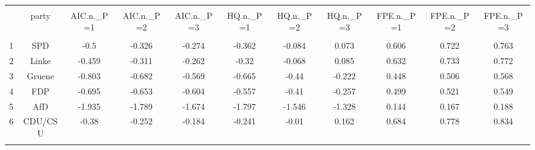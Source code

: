 \begin{table}[!htbp] \centering 
  \caption{} 
  \label{} 
\begin{tabular}{@{\extracolsep{5pt}} ccccccccccc} 
\\[-1.8ex]\hline 
\hline \\[-1.8ex] 
 & party & AIC.n.\_P=1 & AIC.n.\_P=2 & AIC.n.\_P=3 & HQ.n.\_P=1 & HQ.n.\_P=2 & HQ.n.\_P=3 & FPE.n.\_P=1 & FPE.n.\_P=2 & FPE.n.\_P=3 \\ 
\hline \\[-1.8ex] 
1 & SPD & -0.5 & -0.326 & -0.274 & -0.362 & -0.084 & 0.073 & 0.606 & 0.722 & 0.763 \\ 
2 & Linke & -0.459 & -0.311 & -0.262 & -0.32 & -0.068 & 0.085 & 0.632 & 0.733 & 0.772 \\ 
3 & Gruene & -0.803 & -0.682 & -0.569 & -0.665 & -0.44 & -0.222 & 0.448 & 0.506 & 0.568 \\ 
4 & FDP & -0.695 & -0.653 & -0.604 & -0.557 & -0.41 & -0.257 & 0.499 & 0.521 & 0.549 \\ 
5 & AfD & -1.935 & -1.789 & -1.674 & -1.797 & -1.546 & -1.328 & 0.144 & 0.167 & 0.188 \\ 
6 & CDU/CSU & -0.38 & -0.252 & -0.184 & -0.241 & -0.01 & 0.162 & 0.684 & 0.778 & 0.834 \\ 
\hline \\[-1.8ex] 
\end{tabular} 
\end{table}  
